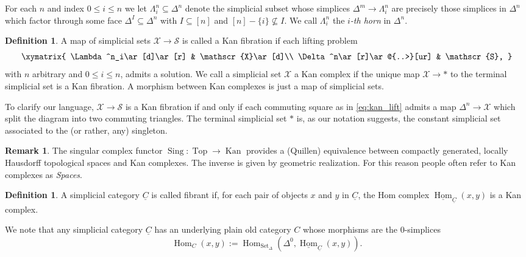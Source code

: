 \documentclass[reqno]{amsart}
\theoremstyle{definition}
\newtheorem{definition}[lemma]{Definition}
\newtheorem{remark}[lemma]{Remark}
\newcommand{\msc}[1]{\mathscr{#1}}
\newcommand{\opn}[1]{\operatorname{#1}}
\newcommand{\uHom}{\underline{\operatorname{Hom}}}
\DeclareMathOperator{\Hom}{Hom}
\renewcommand{\1}{\mathbf{1}}
\begin{document}
For each $n$ and index $0\leq i\leq n$ we let $\Lambda^n_i\subseteq \Delta^n$ denote the simplicial subset whose simplices $\Delta^m\to \Lambda^n_i$ are precisely those simplices in $\Delta^n$ which factor through some face $\Delta^I\subseteq \Delta^n$ with $I\subseteq [n]$ and $[n]-\{i\}\nsubseteq I$.  We call $\Lambda^n_i$ the \emph{$i$-th horn} in $\Delta^n$.

\begin{definition}
A map of simplicial sets $\msc{X}\to \msc{S}$ is called a Kan fibration if each lifting problem
\begin{equation}\label{eq:kan_lift}
\xymatrix{
\Lambda^n_i\ar[d]\ar[r] & \msc{X}\ar[d]\\
\Delta^n\ar[r]\ar@{..>}[ur] & \msc{S},
}
\end{equation}
with $n$ arbitrary and $0\leq i\leq n$, admits a solution.  We call a simplicial set $\msc{X}$ a Kan complex if the unique map $\msc{X}\to \ast$ to the terminal simplicial set is a Kan fibration.  A morphism between Kan complexes is just a map of simplicial sets. 
\end{definition}

To clarify our language, $\msc{X}\to \msc{S}$ is a Kan fibration if and only if each commuting square as in \eqref{eq:kan_lift} admits a map $\Delta^n\to \msc{X}$ which split the diagram into two commuting triangles.  The terminal simplicial set $\ast$ is, as our notation suggests, the constant simplicial set associated to the (or rather, any) singleton.

\begin{remark}
The singular complex functor $\opn{Sing}:\opn{Top}\to \opn{Kan}$ provides a (Quillen) equivalence between compactly generated, locally Hausdorff topological spaces and Kan complexes.  The inverse is given by geometric realization.  For this reason people often refer to Kan complexes as \emph{Spaces}.
\end{remark}

\begin{definition}
A simplicial category $\underline{C}$ is called fibrant if, for each pair of objects $x$ and $y$ in $\underline{C}$, the Hom complex $\uHom_{\underline{C}}(x,y)$ is a Kan complex.
\end{definition}

We note that any simplicial category $\underline{C}$ has an underlying plain old category $C$ whose morphisms are the $0$-simplices
\[
\Hom_C(x,y):=\Hom_{\opn{Set}_{\Delta}}(\Delta^0,\uHom_{\underline{C}}(x,y)).
\]
\end{document}
